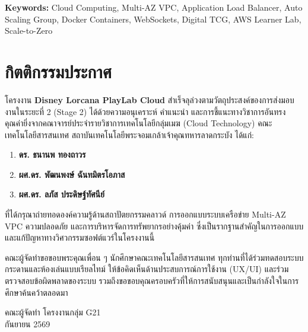 \documentclass[12pt,a4paper]{report}
\begin{document}
\vspace{0.6cm}
\noindent \textbf{Keywords:} Cloud Computing, Multi-AZ VPC, Application Load Balancer, Auto Scaling Group, Docker Containers, WebSockets, Digital TCG, AWS Learner Lab, Scale-to-Zero

\newpage

\chapter*{กิตติกรรมประกาศ}

โครงงาน \textbf{Disney Lorcana PlayLab Cloud} สำเร็จลุล่วงตามวัตถุประสงค์ของการส่งมอบงานในระยะที่ 2 (Stage 2) ได้ด้วยความอนุเคราะห์ คำแนะนำ และการชี้แนะทางวิชาการอันทรงคุณค่ายิ่งจากคณาจารย์ประจำรายวิชาการเทคโนโลยีกลุ่มเมฆ (Cloud Technology) คณะเทคโนโลยีสารสนเทศ สถาบันเทคโนโลยีพระจอมเกล้าเจ้าคุณทหารลาดกระบัง ได้แก่:
\begin{enumerate}
    \item \textbf{ดร. ธนานพ ทองถาวร}
    \item \textbf{ผศ.ดร. พัฒนพงษ์ ฉันทมิตรโอภาส}
    \item \textbf{ผศ.ดร. ลภัส ประดิษฐ์ทัศนีย์}
\end{enumerate}
ที่ได้กรุณาถ่ายทอดองค์ความรู้ด้านสถาปัตยกรรมคลาวด์ การออกแบบระบบเครือข่าย Multi-AZ VPC ความปลอดภัย และการบริหารจัดการทรัพยากรอย่างคุ้มค่า ซึ่งเป็นรากฐานสำคัญในการออกแบบและแก้ปัญหาทางวิศวกรรมซอฟต์แวร์ในโครงงานนี้

คณะผู้จัดทำขอขอบพระคุณเพื่อน ๆ นักศึกษาคณะเทคโนโลยีสารสนเทศ ทุกท่านที่ได้ร่วมทดสอบระบบกระดานและห้องเล่นแบบเรียลไทม์ ให้ข้อคิดเห็นด้านประสบการณ์การใช้งาน (UX/UI) และร่วมตรวจสอบข้อผิดพลาดของระบบ รวมถึงขอขอบคุณครอบครัวที่ให้การสนับสนุนและเป็นกำลังใจในการศึกษาค้นคว้าตลอดมา

\vspace{1.2cm}
\begin{flushright}
    คณะผู้จัดทำ โครงงานกลุ่ม G21\\
    กันยายน 2569
\end{flushright}

\newpage

\tableofcontents
\newpage
\listoftables
\newpage
\listoffigures
\newpage

\setcounter{page}{1}

\end{document}
